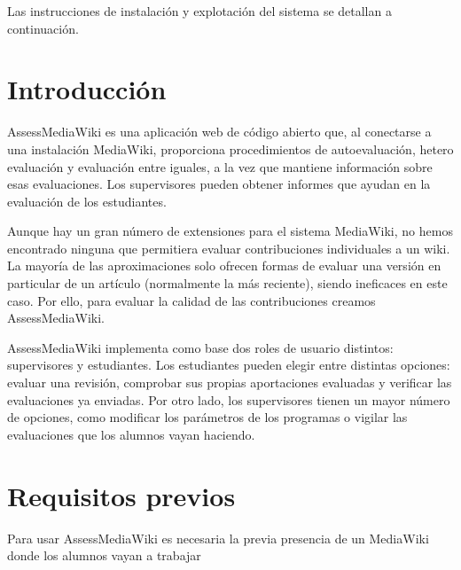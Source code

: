 

Las instrucciones de instalación y explotación del sistema se detallan a continuación.

\section{Introducción}
AssessMediaWiki es una aplicación web de código abierto que, al conectarse a una instalación MediaWiki, proporciona procedimientos de autoevaluación, hetero evaluación y evaluación entre iguales, a la vez que mantiene información sobre esas evaluaciones. Los supervisores pueden obtener informes que ayudan en la evaluación de los estudiantes.
\newline

Aunque hay un gran número de extensiones para el sistema MediaWiki, no hemos encontrado ninguna que permitiera evaluar contribuciones individuales a un wiki. La mayoría de las aproximaciones solo ofrecen formas de evaluar una versión en particular de un artículo (normalmente la más reciente), siendo ineficaces en este caso. Por ello, para evaluar la calidad de las contribuciones creamos AssessMediaWiki.
\newline

AssessMediaWiki implementa como base dos roles de usuario distintos: supervisores y estudiantes. Los estudiantes pueden elegir entre distintas opciones: evaluar una revisión, comprobar sus propias aportaciones evaluadas y verificar las evaluaciones ya enviadas. Por otro lado, los supervisores tienen un mayor número de opciones, como modificar los parámetros de los programas o vigilar las evaluaciones que los alumnos vayan haciendo.
\newline

\section{Requisitos previos}
Para usar AssessMediaWiki es necesaria la previa presencia de un MediaWiki donde los alumnos vayan a trabajar

